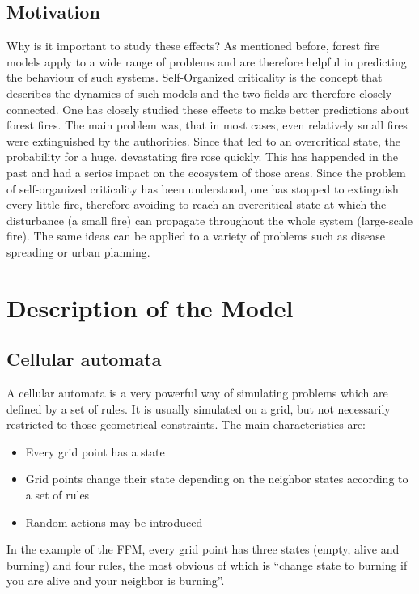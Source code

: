 \documentclass[11pt]{article}
\begin{document}
\subsection{Motivation}
Why is it important to study these effects? As mentioned before, forest fire models apply to a wide range of problems and are therefore helpful in predicting the behaviour of such systems. Self-Organized criticality is the concept that describes the dynamics of such models and the two fields are therefore closely connected. One has closely studied these effects to make better predictions about forest fires. The main problem was, that in most cases, even relatively small fires were extinguished by the authorities. Since that led to an overcritical state, the probability for a huge, devastating fire rose quickly. This has happended in the past and had a serios impact on the ecosystem of those areas.
Since the problem of self-organized criticality has been understood, one has stopped to extinguish every little fire, therefore avoiding to reach an overcritical state at which the disturbance (a small fire) can propagate throughout the whole system (large-scale fire). 
The same ideas can be applied to a variety of problems such as disease spreading or urban planning.


\section{Description of the Model}
\subsection{Cellular automata}

A cellular automata is a very powerful way of simulating problems which are defined by a set of rules. It is usually simulated on a grid, but not necessarily restricted to those geometrical constraints. The main characteristics are:
\begin{itemize}
\item Every grid point has a state

\item Grid points change their state depending on the neighbor states according to a set of rules

\item Random actions may be introduced
\end{itemize}

In the example of the FFM, every grid point has three states (empty, alive and burning) and four rules, the most obvious of which is “change state to burning if you are alive and your neighbor is burning”. 
\end{document}
